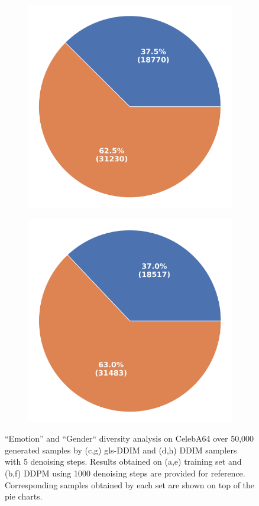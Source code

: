 \begin{figure}  [ht!]
\begin{subfigure}{0.235\textwidth}
    \includegraphics[width=0.8\linewidth]{figs/plots/gslddim-5-500_gender_Gender.png} 
  \end{subfigure}\hfill
  \begin{subfigure}{0.235\textwidth}
  \centering
    \includegraphics[width=0.8\linewidth]{figs/plots/ddim-5-800_gender_Gender.png} 
  \end{subfigure}\hfill
  \caption{``Emotion''  and ``Gender`` diversity analysis on CelebA64 over 50,000 generated samples by (c,g) gls-DDIM and (d,h) DDIM samplers with 5 denoising steps. Results obtained on (a,e) training set and (b,f) DDPM using 1000 denoising steps are provided for reference. Corresponding samples obtained by each set are shown on top of the pie charts.}
  \label{fig:diversity_analysis_emotions}
\end{figure}


